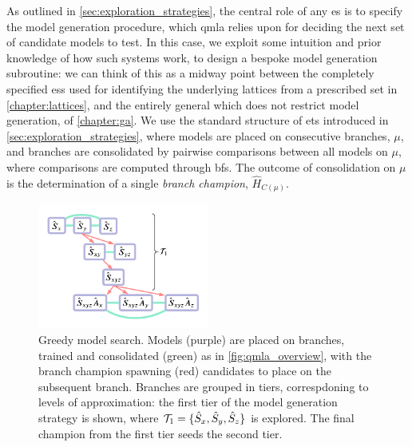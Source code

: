 As outlined in \cref{sec:exploration_strategies}, the central role of any \gls{es} is to specify the 
    model generation procedure, which \gls{qmla} relies upon for deciding the next set of candidate models to test. 
In this case, we exploit some intuition and prior knowledge of how such systems work, 
    to design a bespoke model generation subroutine:
    we can think of this as a midway point between the completely specified \glspl{es} used 
    for identifying the underlying lattices from a prescribed set in \cref{chapter:lattices}, 
    and the entirely general  which does not restrict model generation, of \cref{chapter:ga}.
We use the standard structure of \glspl{et} introduced in \cref{sec:exploration_strategies}, 
    where models are placed on consecutive branches, $\mu$, and branches are consolidated by pairwise comparisons between all models on $\mu$, 
    where comparisons are computed through \glspl{bf}.
The outcome of consolidation on $\mu$ is the determination of a single \emph{branch champion}, $\hat{H}_{C(\mu)}$. 
\par 


\begin{figure}
    \begin{center}
        \includegraphics[width=0.5\textwidth]{experimental_study/figures/greedy_search.pdf}
    \end{center}
    \caption[Greedy model search]{
        Greedy model search. 
        Models (purple) are placed on branches, trained and consolidated (green) as in \cref{fig:qmla_overview}, 
            with the branch champion spawning (red) candidates to place on the subsequent branch.  
        Branches are grouped in tiers, correspdoning to levels of approximation:
            the first tier of the model generation strategy is shown, 
            where $\mathcal{T}_1 = \{ \hat{S}_x, \hat{S}_y, \hat{S}_z\}$ is explored. 
        The final champion from the first tier seeds the second tier. 
    }
    \label{fig:greedy_search}
\end{figure}


